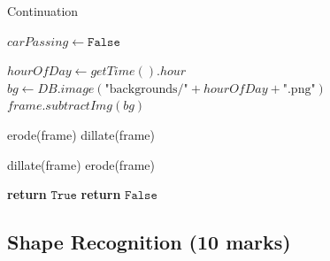 \begin{algorithm}
    \caption{Continuation}
    \begin{algorithmic}[1]

                    \State $ carPassing \leftarrow \texttt{False} $
                \EndIf
            \EndLoop
        \EndProcedure
        
        \Statex

            \State $ hourOfDay \leftarrow getTime().hour $
            \State $ bg \leftarrow DB.image(\text{"backgrounds/"} + hourOfDay + \text{".png"}) $
            \State $ frame.subtractImg(bg) $
        \EndFunction

        \Statex

            \State erode(frame)
            \State dillate(frame)
        \EndFunction

        \Statex

            \State dillate(frame)
            \State erode(frame)
        \EndFunction

        \Statex

                        \State \textbf{return} $ \texttt{True} $
                    \EndIf
                \EndFor
            \EndFor
            \State \textbf{return} $ \texttt{False} $
        \EndFunction
    \end{algorithmic}
\end{algorithm}

\clearpage


\subsection{Shape Recognition (10 marks)}

\newpage
